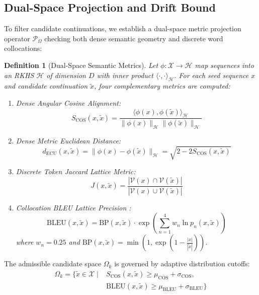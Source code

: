 \documentclass[final,5p,times,twocolumn]{elsarticle}
\newtheorem{definition}{Definition}
\begin{document}
\subsection{Dual-Space Projection and Drift Bound}
\label{subsec:dual_space}

To filter candidate continuations, we establish a dual-space metric projection operator $\mathcal{P}_\Omega$ checking both dense semantic geometry and discrete word collocations:

\begin{definition}[Dual-Space Semantic Metrics]
Let $\phi: \mathcal{X} \to \mathcal{H}$ map sequences into an RKHS $\mathcal{H}$ of dimension $D$ with inner product $\langle \cdot, \cdot \rangle_\mathcal{H}$. For each seed sequence $x$ and candidate continuation $\tilde{x}$, four complementary metrics are computed:
\begin{enumerate}
    \item Dense Angular Cosine Alignment:
    \begin{equation}
        S_{\text{COS}}(x, \tilde{x}) = \frac{\langle \phi(x), \phi(\tilde{x}) \rangle_\mathcal{H}}{\|\phi(x)\|_\mathcal{H} \|\phi(\tilde{x})\|_\mathcal{H}}
    \end{equation}
    \item Dense Metric Euclidean Distance:
    \begin{equation}
        d_{\text{ECU}}(x, \tilde{x}) = \|\phi(x) - \phi(\tilde{x})\|_\mathcal{H} = \sqrt{2 - 2 S_{\text{COS}}(x, \tilde{x})}
    \end{equation}
    \item Discrete Token Jaccard Lattice Metric:
    \begin{equation}
        J(x, \tilde{x}) = \frac{|\mathcal{V}(x) \cap \mathcal{V}(\tilde{x})|}{|\mathcal{V}(x) \cup \mathcal{V}(\tilde{x})|}
    \end{equation}
    \item Collocation BLEU Lattice Precision \cite{papineni2002bleu}:
    \begin{equation}
        \text{BLEU}(x, \tilde{x}) = \text{BP}(x, \tilde{x}) \cdot \exp\left(\sum_{n=1}^4 w_n \ln p_n(x, \tilde{x})\right)
    \end{equation}
    where $w_n = 0.25$ and $\text{BP}(x, \tilde{x}) = \min\left(1, \exp\left(1 - \frac{|x|}{|\tilde{x}|}\right)\right)$.
\end{enumerate}
\end{definition}

The admissible candidate space $\Omega_k$ is governed by adaptive distribution cutoffs:
\begin{equation}
\begin{aligned}
    \Omega_k = \Big\{ \tilde{x} \in \mathcal{X} \;\Big|\; & S_{\text{COS}}(x, \tilde{x}) \ge \mu_{\text{COS}} + \sigma_{\text{COS}}, \\
    & \text{BLEU}(x, \tilde{x}) \ge \mu_{\text{BLEU}} + \sigma_{\text{BLEU}} \Big\}
\end{aligned}
\end{equation}
\end{document}
